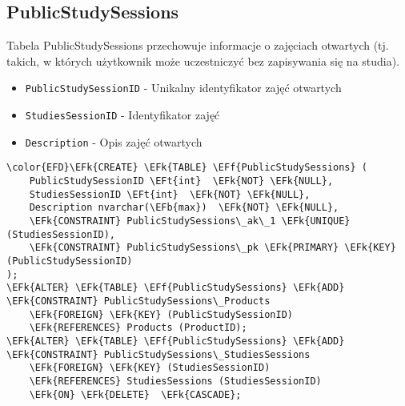 \documentclass[11pt]{article}
\newcommand{\EFk}[1]{\textcolor{EFk}{\textbf{#1}}} %
\newcommand{\EFb}[1]{\textcolor{EFb}{\textbf{#1}}} %
\newcommand{\EFf}[1]{\textcolor{EFf}{#1}} %
\newcommand{\EFt}[1]{\textcolor{EFt}{\textbf{#1}}} %
\begin{document}
\subsection{PublicStudySessions}
\label{sec:org077d4d2}
Tabela PublicStudySessions przechowuje informacje o zajęciach otwartych  (tj. takich, w których użytkownik może uczestniczyć bez zapisywania się na studia).
\begin{itemize}
\item \texttt{PublicStudySessionID} - Unikalny identyfikator zajęć otwartych
\item \texttt{StudiesSessionID} - Identyfikator zajęć
\item \texttt{Description} - Opis zajęć otwartych
\end{itemize}
\begin{Code}
\begin{Verbatim}
\color{EFD}\EFk{CREATE} \EFk{TABLE} \EFf{PublicStudySessions} (
    PublicStudySessionID \EFt{int}  \EFk{NOT} \EFk{NULL},
    StudiesSessionID \EFt{int}  \EFk{NOT} \EFk{NULL},
    Description nvarchar(\EFb{max})  \EFk{NOT} \EFk{NULL},
    \EFk{CONSTRAINT} PublicStudySessions\_ak\_1 \EFk{UNIQUE} (StudiesSessionID),
    \EFk{CONSTRAINT} PublicStudySessions\_pk \EFk{PRIMARY} \EFk{KEY}  (PublicStudySessionID)
);
\EFk{ALTER} \EFk{TABLE} \EFf{PublicStudySessions} \EFk{ADD} \EFk{CONSTRAINT} PublicStudySessions\_Products
    \EFk{FOREIGN} \EFk{KEY} (PublicStudySessionID)
    \EFk{REFERENCES} Products (ProductID);
\EFk{ALTER} \EFk{TABLE} \EFf{PublicStudySessions} \EFk{ADD} \EFk{CONSTRAINT} PublicStudySessions\_StudiesSessions
    \EFk{FOREIGN} \EFk{KEY} (StudiesSessionID)
    \EFk{REFERENCES} StudiesSessions (StudiesSessionID)
    \EFk{ON} \EFk{DELETE}  \EFk{CASCADE};
\end{Verbatim}
\end{Code}
\end{document}
